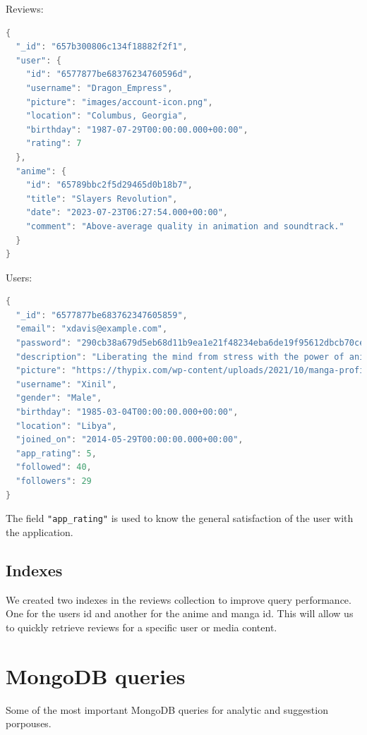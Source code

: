 \newpage
Reviews:
\begin{mdframed}[backgroundcolor=yellow!20, innerleftmargin=10pt, innerrightmargin=10pt]
    \begin{lstlisting}[language=java]
{
  "_id": "657b300806c134f18882f2f1",
  "user": {
    "id": "6577877be68376234760596d",
    "username": "Dragon_Empress",
    "picture": "images/account-icon.png",
    "location": "Columbus, Georgia",
    "birthday": "1987-07-29T00:00:00.000+00:00",
    "rating": 7
  },
  "anime": {
    "id": "65789bbc2f5d29465d0b18b7",
    "title": "Slayers Revolution",
    "date": "2023-07-23T06:27:54.000+00:00",
    "comment": "Above-average quality in animation and soundtrack."
  }
}
    \end{lstlisting}
\end{mdframed}

Users:
\begin{mdframed}[backgroundcolor=yellow!20, innerleftmargin=10pt, innerrightmargin=10pt]
    \begin{lstlisting}[language=java]
{
  "_id": "6577877be683762347605859",
  "email": "xdavis@example.com",
  "password": "290cb38a679d5eb68d11b9ea1e21f48234eba6de19f95612dbcb70ce0c7e4e78",
  "description": "Liberating the mind from stress with the power of anime zen.",
  "picture": "https://thypix.com/wp-content/uploads/2021/10/manga-profile-picture-44",
  "username": "Xinil",
  "gender": "Male",
  "birthday": "1985-03-04T00:00:00.000+00:00",
  "location": "Libya",
  "joined_on": "2014-05-29T00:00:00.000+00:00",
  "app_rating": 5,
  "followed": 40,
  "followers": 29
}
    \end{lstlisting}
\end{mdframed}


The field \texttt{"app\_rating"} is used to know the general satisfaction of the user with the application.


\subsection{Indexes}

We created two indexes in the reviews collection to improve query performance. One for the users id and another for the anime and manga id. This will allow us to quickly retrieve reviews for a specific user or media content. 


\newpage
\section {MongoDB queries}
Some of the most important MongoDB queries for analytic and suggestion porpouses. 



